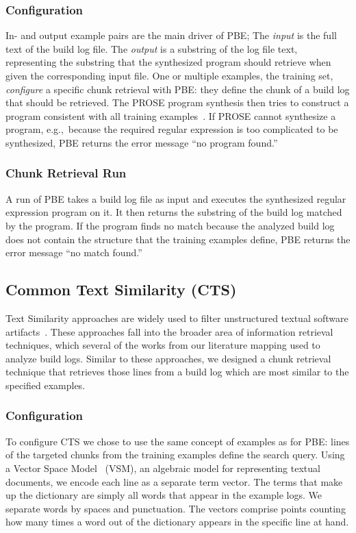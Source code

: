 \subsubsection{Configuration}
In- and output example pairs are the main driver of PBE;
The \emph{input} is the full text of the build log file.
The \emph{output} is
a substring of the log file text, representing the
substring that the synthesized program should retrieve when
given the corresponding input file.
One or multiple examples, the
training set, \emph{configure} a specific chunk retrieval with PBE:
they define the chunk of a build log that should be retrieved.
The PROSE program synthesis then tries to construct a program
consistent with all training
examples~\citep{mitchell1982generalization}.
If PROSE cannot synthesize a program, e.g.,\
because the required regular expression
is too complicated to be synthesized, PBE returns the
error message ``no program found.''

\subsubsection{Chunk Retrieval Run}
A run of PBE takes a build log file as input and executes the
synthesized regular expression program on it.
It then returns the substring
of the build log matched by the program.
If the program finds no match because the analyzed build log
does not contain the structure that the training examples define,
PBE returns the error message ``no match found.''

\subsection{Common Text Similarity (CTS)}
Text Similarity approaches are widely used to filter unstructured
textual software artifacts~\citep{runeson2007detection,
marcus2005recovery,antoniol2002recovering,mccarey2006recommending}.
These approaches fall into the broader area of information retrieval
techniques, which several of the works from our literature mapping
used to analyze build logs.
Similar to these approaches, we designed a chunk retrieval
technique that
retrieves those lines from a build log which are most
similar to the specified examples.

\subsubsection{Configuration}
To configure CTS we chose to use the same concept of examples as for
PBE: lines of the targeted chunks from the training examples define
the search query.
Using a Vector Space
Model~\citep{schutze2008introduction} (VSM), an algebraic model for
representing textual documents, we encode each line as a separate term
vector.
The terms that make up the dictionary are simply all words
that appear in the example logs.
We separate words by spaces and
punctuation.
The vectors comprise points counting
how many times a word out of the dictionary appears in the specific
line at hand.

